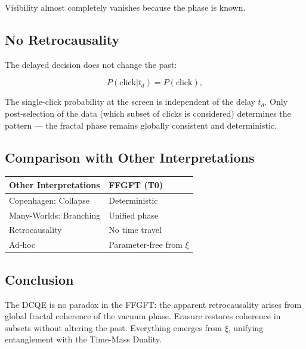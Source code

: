 	Visibility almost completely vanishes because the phase is known.
	
	\subsection*{No Retrocausality}
	
	The delayed decision does not change the past:
	
	\begin{equation}
		P(\text{click}|t_d) = P(\text{click}),
	\end{equation}
	
	The single-click probability at the screen is independent of the delay \(t_d\). Only post-selection of the data (which subset of clicks is considered) determines the pattern — the fractal phase remains globally consistent and deterministic.
	
	\subsection*{Comparison with Other Interpretations}
	
	\begin{center}
		\begin{tabular}{p{}p{}}
			\textbf{Other Interpretations} & \textbf{FFGFT (T0)} \\
			\hline
			Copenhagen: Collapse & Deterministic \\
			Many-Worlds: Branching & Unified phase \\
			Retrocausality & No time travel \\
			Ad-hoc & Parameter-free from \(\xi\) \\
		\end{tabular}
	\end{center}
	
	\subsection*{Conclusion}
	
	The DCQE is no paradox in the FFGFT: the apparent retrocausality arises from global fractal coherence of the vacuum phase. Erasure restores coherence in subsets without altering the past. Everything emerges from \(\xi\), unifying entanglement with the Time-Mass Duality.



